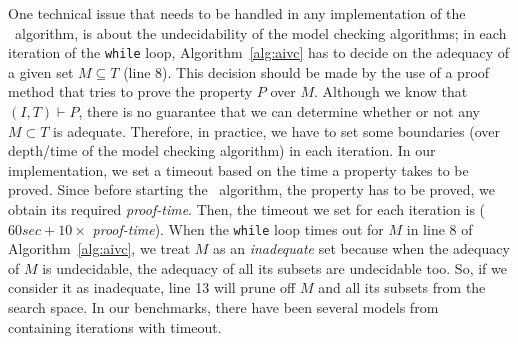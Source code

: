 One technical issue that needs to
be handled in any implementation of the \aivcalg ~algorithm,
is about the undecidability of the model checking algorithms;
in each iteration of the \texttt{while} loop, Algorithm~\ref{alg:aivc}
has to decide on the adequacy of a given set $M \subseteq T$ (line 8).
This decision should be made by the use of a proof method that
tries to prove the property $P$ over $M$. Although we know that $(I, T) \vdash P$,
there is no guarantee that we can determine whether or not any $M \subset T$ is adequate.
Therefore, in practice, we have to set some boundaries
(over depth/time of the model checking algorithm) in each iteration.
In our implementation, we set a timeout based on the time a property takes to be proved.
Since before starting the \aivcalg ~algorithm, the property has to be proved,
we obtain its required \emph{proof-time}.
Then, the timeout we set for each iteration is ($60 sec  + 10 \times$ \emph{proof-time}).
When the \texttt{while} loop times out for $M$ in line 8 of Algorithm~\ref{alg:aivc},
we treat $M$ as an \emph{inadequate} set because
when the adequacy of $M$ is undecidable,
 the adequacy of all its subsets are undecidable too. So, if we consider it as inadequate, line 13 will prune off $M$ and all its subsets from the search space. 
In our benchmarks, there have been several models from~\cite{Hagen08:FMCAD} containing iterations with timeout.


%

 
